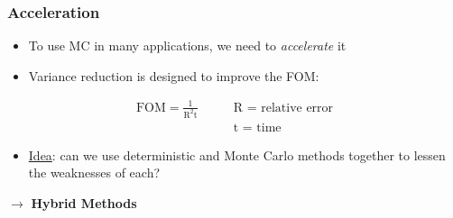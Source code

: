\documentclass[xcolor=x11names,compress]{beamer}
\renewcommand{\(}{\begin{columns}}
\renewcommand{\)}{\end{columns}}
\newcommand{\<}[1]{\begin{column}{#1}}
\renewcommand{\>}{\end{column}}
\begin{document}
\begin{frame}[fragile]
  \frametitle{Acceleration}
  \begin{itemize}
  	\item To use MC in many applications, we need to \textit{accelerate} it
	\item Variance reduction is designed to improve the FOM:
  \end{itemize}
\begin{align}
\text{FOM} = \frac{1}{\text{R}^2\text{t}} \qquad & \text{R = relative error} \nonumber \\ 
& \text{t = time} \nonumber 
\end{align}
  \begin{itemize}
  	\item \underline{Idea}: can we use deterministic and Monte Carlo methods together to lessen the weaknesses of each?
  \end{itemize}
  $\rightarrow$ \textbf{Hybrid Methods}

\end{frame}
\end{document}
